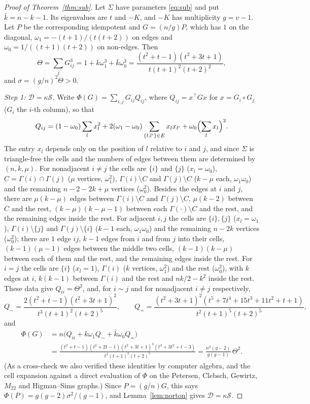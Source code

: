 \documentclass[11pt]{article}
\theoremstyle{definition}
\theoremstyle{remark}
\begin{document}
\begin{proof}[Proof of Theorem~\ref{thm:sub}]
Let $\Sigma$ have parameters \eqref{eq:sub} and put $\bar k=n-k-1$. Its
eigenvalues are $t$ and $-K$, and $-K$ has multiplicity $g=v-1$. Let $P$ be
the corresponding idempotent and $G=(n/g)P$, which has $1$ on the diagonal,
$\omega_1=-(t+1)/(t(t+2))$ on edges and $\omega_0=1/((t+1)(t+2))$ on
non-edges. Then
\[
 \Theta=\sum_jG_{ij}^3=1+k\omega_1^3+\bar k\omega_0^3
 =\frac{(t^2+t-1)(t^2+3t+1)}{t(t+1)^2(t+2)^2},
\]
and $\sigma=(g/n)^2\Theta>0$.

\emph{Step 1: $\mathcal D=\kappa\mathcal S$.} Write
$\Phi(G)=\sum_{i,j}G_{ij}Q_{ij}$, where $Q_{ij}=x^\top Gx$ for
$x=G_i\circ G_j$ ($G_i$ the $i$-th column), so that
\[
 Q_{ij}=(1-\omega_0)\sum_lx_l^2+2(\omega_1-\omega_0)\sum_{\{l,l'\}\in E}x_lx_{l'}
 +\omega_0\Bigl(\sum_lx_l\Bigr)^2 .
\]
The entry $x_l$ depends only on the position of $l$ relative to $i$ and $j$,
and since $\Sigma$ is triangle-free the cells and the numbers of edges
between them are determined by $(n,k,\mu)$. For nonadjacent $i\ne j$ the cells
are $\{i\}$ and $\{j\}$ ($x_l=\omega_0$), $C=\Gamma(i)\cap\Gamma(j)$ ($\mu$
vertices, $\omega_1^2$), $\Gamma(i)\setminus C$ and $\Gamma(j)\setminus C$
($k-\mu$ each, $\omega_1\omega_0$) and the remaining $n-2-2k+\mu$ vertices
($\omega_0^2$). Besides the edges at $i$ and $j$, there are $\mu(k-\mu)$ edges
between $\Gamma(i)\setminus C$ and $\Gamma(j)\setminus C$, $\mu(k-2)$ between
$C$ and the rest, $(k-\mu)(k-\mu-1)$ between each $\Gamma(\cdot)\setminus C$
and the rest, and the remaining edges inside the rest. For adjacent $i,j$ the
cells are $\{i\},\{j\}$ ($x_l=\omega_1$), $\Gamma(i)\setminus\{j\}$ and
$\Gamma(j)\setminus\{i\}$ ($k-1$ each, $\omega_1\omega_0$) and the remaining
$n-2k$ vertices ($\omega_0^2$); there are $1$ edge $ij$, $k-1$ edges from $i$
and from $j$ into their cells, $(k-1)(\mu-1)$ edges between the middle two
cells, $(k-1)(k-\mu)$ between each of them and the rest, and the remaining
edges inside the rest. For $i=j$ the cells are $\{i\}$ ($x_l=1$), $\Gamma(i)$
($k$ vertices, $\omega_1^2$) and the rest ($\omega_0^2$), with $k$ edges at
$i$, $k(k-1)$ between $\Gamma(i)$ and the rest and $nk/2-k^2$ inside the rest.
These data give $Q_{ii}=\Theta^2$,
and, for $i\sim j$ and for nonadjacent $i\ne j$ respectively,
\[
 Q_{\sim}=\frac{2(t^2+t-1)(t^2+3t+1)^2}{t^3(t+1)^2(t+2)^5},\qquad
 Q_{\not\sim}=\frac{(t^2+3t+1)^2(t^5+7t^4+15t^3+11t^2+t+1)}{t^2(t+1)^5(t+2)^5},
\]
and
\begin{align*}
 \Phi(G)&=n\bigl(Q_{ii}+k\omega_1Q_{\sim}+\bar k\omega_0Q_{\not\sim}\bigr)\\
 &=\frac{(t^2+t-1)(t^2+2t-1)(t^2+3t+1)^4(t^3+3t^2+t-3)}{t^2(t+1)^5(t+2)^5}
 =\frac{n^2(g-2)}{g(g-1)}\,\Theta^2 .
\end{align*}
(As a cross-check we also verified these identities by computer algebra, and the cell
expansion against a direct evaluation of $\Phi$ on the Petersen, Clebsch,
Gewirtz, $M_{22}$ and Higman--Sims graphs.) Since $P=(g/n)G$, this says
$\Phi(P)=g(g-2)\sigma^2/(g-1)$, and Lemma~\ref{lem:norton} gives
$\mathcal D=\kappa\mathcal S$.


\end{proof}
\end{document}
